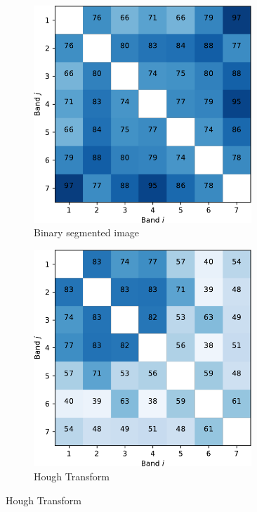 \documentclass{article}
\begin{document}
\begin{figure}[h]
\begin{subfigure}[b]{0.49\linewidth}
    \includegraphics[width=0.9\textwidth]{un-crop.pdf} 
    \caption{Binary segmented image} 
    \label{fig7:b} 
    \end{subfigure} 
  \begin{subfigure}[b]{0.49\linewidth}
    \centering
    \includegraphics[width=0.9\textwidth]{kmeans-crop.pdf} 
    \caption{Hough Transform} 

\end{subfigure}
\end{figure}
\end{document}
